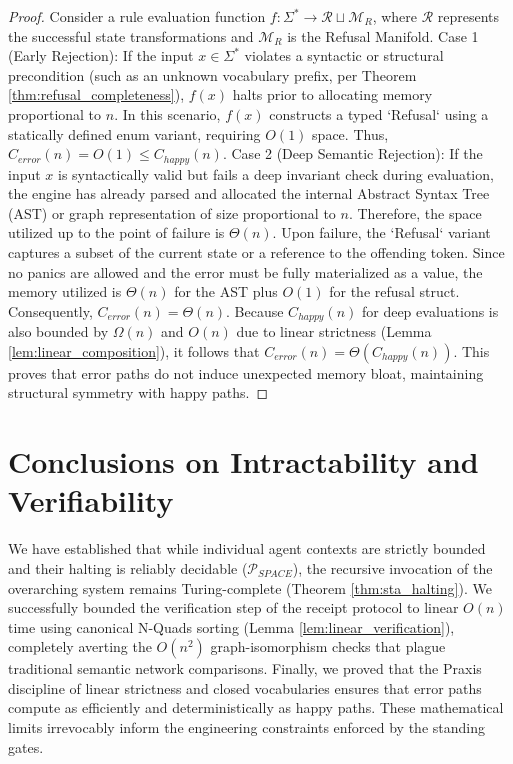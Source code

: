\begin{proof}
Consider a rule evaluation function $f: \Sigma^* \rightarrow \mathcal{R} \sqcup \mathcal{M}_R$, where $\mathcal{R}$ represents the successful state transformations and $\mathcal{M}_R$ is the Refusal Manifold. 
Case 1 (Early Rejection): If the input $x \in \Sigma^*$ violates a syntactic or structural precondition (such as an unknown vocabulary prefix, per Theorem \ref{thm:refusal_completeness}), $f(x)$ halts prior to allocating memory proportional to $n$. In this scenario, $f(x)$ constructs a typed `Refusal` using a statically defined enum variant, requiring $O(1)$ space. Thus, $C_{error}(n) = O(1) \le C_{happy}(n)$.
Case 2 (Deep Semantic Rejection): If the input $x$ is syntactically valid but fails a deep invariant check during evaluation, the engine has already parsed and allocated the internal Abstract Syntax Tree (AST) or graph representation of size proportional to $n$. Therefore, the space utilized up to the point of failure is $\Theta(n)$. Upon failure, the `Refusal` variant captures a subset of the current state or a reference to the offending token. Since no panics are allowed and the error must be fully materialized as a value, the memory utilized is $\Theta(n)$ for the AST plus $O(1)$ for the refusal struct. Consequently, $C_{error}(n) = \Theta(n)$. 
Because $C_{happy}(n)$ for deep evaluations is also bounded by $\Omega(n)$ and $O(n)$ due to linear strictness (Lemma \ref{lem:linear_composition}), it follows that $C_{error}(n) = \Theta(C_{happy}(n))$.
This proves that error paths do not induce unexpected memory bloat, maintaining structural symmetry with happy paths.
\end{proof}

\section{Conclusions on Intractability and Verifiability}

We have established that while individual agent contexts are strictly bounded and their halting is reliably decidable ($\mathcal{P}_{SPACE}$), the recursive invocation of the overarching system remains Turing-complete (Theorem \ref{thm:sta_halting}). We successfully bounded the verification step of the receipt protocol to linear $O(n)$ time using canonical N-Quads sorting (Lemma \ref{lem:linear_verification}), completely averting the $O(n^2)$ graph-isomorphism checks that plague traditional semantic network comparisons. Finally, we proved that the Praxis discipline of linear strictness and closed vocabularies ensures that error paths compute as efficiently and deterministically as happy paths. These mathematical limits irrevocably inform the engineering constraints enforced by the standing gates.
